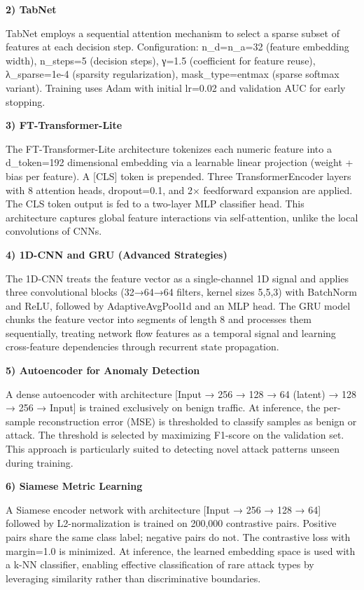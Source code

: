 \documentclass[
  journal,
  10pt]{IEEEtran}
\begin{document}
\textbf{2) TabNet}

TabNet employs a sequential attention mechanism to select a sparse
subset of features at each decision step. Configuration: n\_d=n\_a=32
(feature embedding width), n\_steps=5 (decision steps), γ=1.5
(coefficient for feature reuse), λ\_sparse=1e-4 (sparsity
regularization), mask\_type=\textquotesingle entmax\textquotesingle{}
(sparse softmax variant). Training uses Adam with initial lr=0.02 and
validation AUC for early stopping.

\textbf{3) FT-Transformer-Lite}

The FT-Transformer-Lite architecture tokenizes each numeric feature into
a d\_token=192 dimensional embedding via a learnable linear projection
(weight + bias per feature). A {[}CLS{]} token is prepended. Three
TransformerEncoder layers with 8 attention heads, dropout=0.1, and 2×
feedforward expansion are applied. The CLS token output is fed to a
two-layer MLP classifier head. This architecture captures global feature
interactions via self-attention, unlike the local convolutions of CNNs.

\textbf{4) 1D-CNN and GRU (Advanced Strategies)}

The 1D-CNN treats the feature vector as a single-channel 1D signal and
applies three convolutional blocks (32→64→64 filters, kernel sizes
5,5,3) with BatchNorm and ReLU, followed by AdaptiveAvgPool1d and an MLP
head. The GRU model chunks the feature vector into segments of length 8
and processes them sequentially, treating network flow features as a
temporal signal and learning cross-feature dependencies through
recurrent state propagation.

\textbf{5) Autoencoder for Anomaly Detection}

A dense autoencoder with architecture {[}Input → 256 → 128 → 64 (latent)
→ 128 → 256 → Input{]} is trained exclusively on benign traffic. At
inference, the per-sample reconstruction error (MSE) is thresholded to
classify samples as benign or attack. The threshold is selected by
maximizing F1-score on the validation set. This approach is particularly
suited to detecting novel attack patterns unseen during training.

\textbf{6) Siamese Metric Learning}

A Siamese encoder network with architecture {[}Input → 256 → 128 → 64{]}
followed by L2-normalization is trained on 200,000 contrastive pairs.
Positive pairs share the same class label; negative pairs do not. The
contrastive loss with margin=1.0 is minimized. At inference, the learned
embedding space is used with a k-NN classifier, enabling effective
classification of rare attack types by leveraging similarity rather than
discriminative boundaries.
\end{document}
